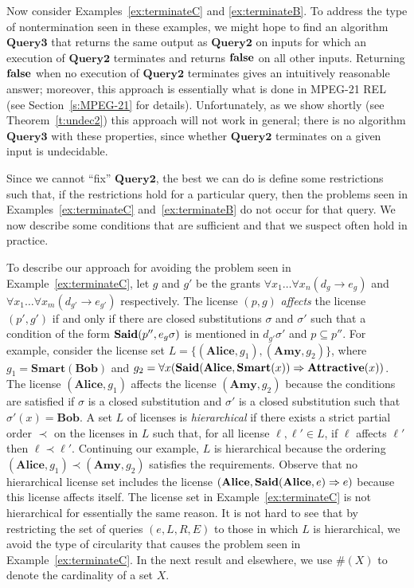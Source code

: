 \documentclass{acmtrans2m}
\newcommand{\rimp}{\Rightarrow}
\newcommand{\<}{
}
\renewcommand{\>}{\rangle}
\newcommand{\card}[1]{\#({#1})}
\newcommand{\Said}{\mathit{\bf Said}}
\newcommand{\false}{\mathit{\bf{false}}}
\newcommand{\cd}{d}
\newcommand{\cc}{e}
\newcommand{\scc}{E}
\newcommand{\imp}{\rightarrow}
\newcommand{\XProcTwo}{\textbf{Query2}}
\newcommand{\XProcFour}{\textbf{Query3}}
\newcommand{\pred}[1]{\mathbf{#1}}
\newcommand{\const}[1]{\mathbf{#1}}
\begin{document}
Now consider Examples~\ref{ex:terminateC} and \ref{ex:terminateB}.  To address the type of
nontermination seen in these examples, we might hope to find an algorithm $\XProcFour$ that
returns the same output as $\XProcTwo$ on inputs for which an execution of $\XProcTwo$
terminates and returns $\false$ on all other inputs.  Returning $\false$ when no execution
of $\XProcTwo$ terminates gives an intuitively reasonable answer; moreover, this approach
is essentially what is done in MPEG-21 REL (see Section~\ref{s:MPEG-21} for details).
Unfortunately, as we show shortly (see Theorem~\ref{t:undec2}) this approach will not work
in general; there is no algorithm $\XProcFour$ with these properties, since whether
$\XProcTwo$ terminates on a given input is undecidable.

Since we cannot ``fix'' $\XProcTwo$, the best we can do is define some restrictions such
that, if the restrictions hold for a particular query, then the problems seen in
Examples~\ref{ex:terminateC} and~\ref{ex:terminateB} do not occur for that query.  We now
describe some conditions that are sufficient and that we suspect often hold in practice.

To describe our approach for avoiding the problem seen in Example~\ref{ex:terminateC}, let
$g$ and $g'$ be the grants $\forall x_1\ldots\forall x_n(\cd_g\imp\cc_g)$ and
$\forall x_1\ldots\forall x_m(\cd_{g'}\imp\cc_{g'})$ respectively.  The license $(p,g)$
\emph{affects} the license $(p', g')$ if and only if there are closed substitutions $\sigma$
and $\sigma'$ such that a condition of the form $\Said(p'', \cc_g\sigma)$ is mentioned in
$\cd_{g'}\sigma'$ and $p\subseteq p''$.  For example, consider the license set
$L = \{(\const{Alice}, g_1), (\const{Amy}, g_2)\}$, where $g_1 = \pred{Smart}(\const{Bob})$
and $g_2 = \forall x(\Said(\const{Alice}, \pred{Smart}(x))\rimp\pred{Attractive}(x))$.  The
license $(\const{Alice}, g_1)$ affects the license $(\const{Amy}, g_2)$ because the conditions
are satisfied if $\sigma$ is a closed substitution and $\sigma'$ is a closed substitution such
that $\sigma'(x) = \const{Bob}$.  A set $L$ of licenses is \emph{hierarchical} if there exists
a strict partial order $\prec$ on the licenses in $L$ such that, for all license
$\ell, \ell'\in L$, if $\ell$ affects $\ell'$ then $\ell\prec\ell'$.  Continuing our example,
$L$ is hierarchical because the ordering $(\const{Alice}, g_1) \prec (\const{Amy}, g_2)$
satisfies the requirements.  Observe that no hierarchical license set includes the license
$(\const{Alice}, \Said(\const{Alice}, \cc)\rimp\cc)$ because this license affects itself.  The
license set in Example~\ref{ex:terminateC} is not hierarchical for essentially the same reason.
It is not hard to see that by restricting the set of queries $(\cc, L, R, \scc)$ to those in
which $L$ is hierarchical, we avoid the type of circularity that causes the problem seen in
Example~\ref{ex:terminateC}.  In the next result and elsewhere, we use $\card{X}$ to denote the
cardinality of a set $X$.
\end{document}

